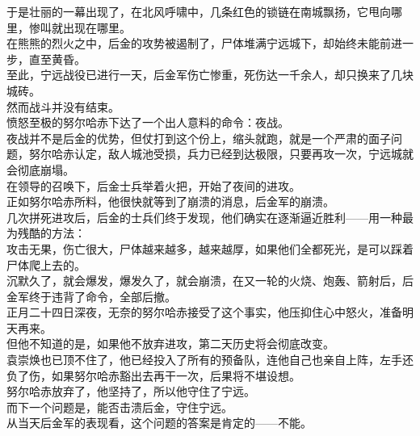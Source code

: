 \begin{multicols}{\theparacolNo}
于是壮丽的一幕出现了，在北风呼啸中，几条红色的锁链在南城飘扬，它甩向哪里，惨叫就出现在哪里。\\

在熊熊的烈火之中，后金的攻势被遏制了，尸体堆满宁远城下，却始终未能前进一步，直至黄昏。\\

至此，宁远战役已进行一天，后金军伤亡惨重，死伤达一千余人，却只换来了几块城砖。\\

然而战斗并没有结束。\\

愤怒至极的努尔哈赤下达了一个出人意料的命令：夜战。\\

夜战并不是后金的优势，但仗打到这个份上，缩头就跑，就是一个严肃的面子问题，努尔哈赤认定，敌人城池受损，兵力已经到达极限，只要再攻一次，宁远城就会彻底崩塌。\\

在领导的召唤下，后金士兵举着火把，开始了夜间的进攻。\\

正如努尔哈赤所料，他很快就等到了崩溃的消息，后金军的崩溃。\\

几次拼死进攻后，后金的士兵们终于发现，他们确实在逐渐逼近胜利——用一种最为残酷的方法：\\

攻击无果，伤亡很大，尸体越来越多，越来越厚，如果他们全都死光，是可以踩着尸体爬上去的。\\

沉默久了，就会爆发，爆发久了，就会崩溃，在又一轮的火烧、炮轰、箭射后，后金军终于违背了命令，全部后撤。\\

正月二十四日深夜，无奈的努尔哈赤接受了这个事实，他压抑住心中怒火，准备明天再来。\\

但他不知道的是，如果他不放弃进攻，第二天历史将会彻底改变。\\

袁崇焕也已顶不住了，他已经投入了所有的预备队，连他自己也亲自上阵，左手还负了伤，如果努尔哈赤豁出去再干一次，后果将不堪设想。\\

努尔哈赤放弃了，他坚持了，所以他守住了宁远。\\

而下一个问题是，能否击溃后金，守住宁远。\\

从当天后金军的表现看，这个问题的答案是肯定的——不能。\\


\end{multicols}
